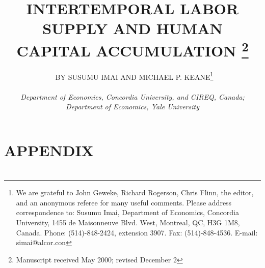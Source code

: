 \documentclass[12pt]{article}
\title{\large \textbf{INTERTEMPORAL LABOR SUPPLY AND HUMAN CAPITAL ACCUMULATION} \thanks{Manuscript received May 2000; revised December 2}}
\author{\normalsize\ BY SUSUMU IMAI AND MICHAEL P. KEANE\footnote{We are grateful to John Geweke, Richard Rogerson, Chris Flinn, the editor, and an anonymous referee for many useful comments. Please address correspondence to: Susumu Imai, Department of Economics, Concordia University, 1455 de Maisonneuve Blvd. West, Montreal, QC, H3G 1M8, Canada. Phone: (514)-848-2424, extension 3907. Fax: (514)-848-4536. E-mail: simai@alcor.con} \\
  \\
  \textit{Department of Economics, Concordia University, and CIREQ, Canada;}\\
  \textit{Department of Economics, Yale University}
}
\date{}
\begin{document}
 

\begin{adjustwidth}{50pt}{50pt}
\maketitle

\begin{abstract}
    
  
\end{abstract}
\end{adjustwidth}
\hspace{0.5cm}















\appendix
\label{appendix}
\section*{APPENDIX}

\section*{ }

\section*{ }




\nocite{*} %
\end{document}
